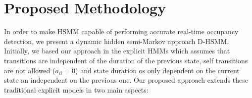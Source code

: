 \documentclass[conference]{IEEEtran}
\begin{document}
%
%


\section{Proposed Methodology}

In order to make HSMM capable of performing accurate real-time occupancy detection, we present a dynamic hidden semi-Markov approach D-HSMM. Initially, we based our approach in the explicit HMMs which assumes that transitions are independent of the duration of the previous state, self transitions are not allowed ($a_{ii}=0$) and state duration os only dependent on the current state an independent on the previous one\cite{Yu2010}. Our proposed approach extends these traditional explicit models in two main aspects:
\end{document}
